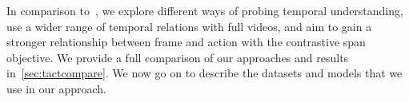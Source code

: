 In comparison to~\cite{bagad2023testoftime}, we explore different ways of
probing temporal understanding, use a wider range of temporal relations with
full videos, and aim to gain a stronger relationship between frame and action
with the contrastive span objective. We provide a full comparison of our
approaches and results in~\cref{sec:tactcompare}. We now go on to describe the
datasets and models that we use in our approach.
